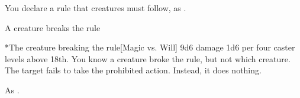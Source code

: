 \begin{spellheader}
    \spelldur{\durshort}
\end{spellheader}
\begin{spelleffects}
    \spelleffect You declare a rule that creatures must follow, as .
    \begin{spelltrigger}{A creature breaks the rule}
        \begin{spelltarget}*{The creature breaking the rule}[Magic vs. Will]
            \spelleffect 9d6 damage \add 1d6 per four caster levels above 18th. You know a creature broke the rule, but not which creature.
            \spellsuccess The target fails to take the prohibited action. Instead, it does nothing.
        \end{spelltarget}
    \end{spelltrigger}
\end{spelleffects}
\begin{spellfooter}
    \spellnotes As .
\end{spellfooter}

